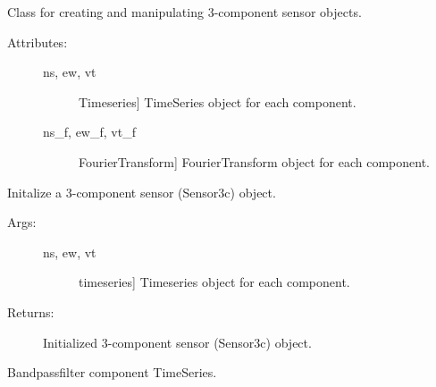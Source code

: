 \documentclass[letterpaper,10pt,english,openany,oneside]{sphinxmanual}
\begin{document}
\begin{fulllineitems}
\label{\detokenize{index:hvsrpy.Sensor3c}}
Class for creating and manipulating 3-component sensor objects.
\begin{description}
\item[{Attributes:}] \leavevmode\begin{description}
\item[{ns, ew, vt}] \leavevmode{[}Timeseries{]}
TimeSeries object for each component.

\item[{ns\_f, ew\_f, vt\_f}] \leavevmode{[}FourierTransform{]}
FourierTransform object for each component.

\end{description}

\end{description}

\begin{fulllineitems}
\label{\detokenize{index:hvsrpy.Sensor3c.__init__}}
Initalize a 3-component sensor (Sensor3c) object.
\begin{description}
\item[{Args:}] \leavevmode\begin{description}
\item[{ns, ew, vt}] \leavevmode{[}timeseries{]}
Timeseries object for each component.

\end{description}

\item[{Returns:}] \leavevmode
Initialized 3-component sensor (Sensor3c) object.

\end{description}

\end{fulllineitems}


\begin{fulllineitems}
\label{\detokenize{index:hvsrpy.Sensor3c.bandpassfilter}}
Bandpassfilter component TimeSeries.


\end{fulllineitems}
\end{fulllineitems}
\end{document}
